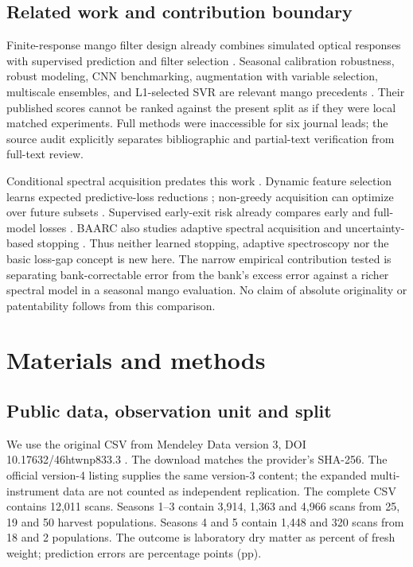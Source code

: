 \documentclass[11pt,a4paper]{article}
\begin{document}
\subsection{Related work and contribution boundary}
Finite-response mango filter design already combines simulated optical responses with supervised prediction and filter selection \citep{gutierrez2019}. Seasonal calibration robustness, robust modeling, CNN benchmarking, augmentation with variable selection, multiscale ensembles, and L1-selected SVR are relevant mango precedents \citep{anderson2020,mishra2023,walsh2024,yang2025,yang2026,ma2026}. Their published scores cannot be ranked against the present split as if they were local matched experiments. Full methods were inaccessible for six journal leads; the source audit explicitly separates bibliographic and partial-text verification from full-text review.

Conditional spectral acquisition predates this work \citep{huang2015}. Dynamic feature selection learns expected predictive-loss reductions \citep{covert2023}; non-greedy acquisition can optimize over future subsets \citep{valancius2024}. Supervised early-exit risk already compares early and full-model losses \citep{jazbec2024}. BAARC also studies adaptive spectral acquisition and uncertainty-based stopping \citep{baarc2026}. Thus neither learned stopping, adaptive spectroscopy nor the basic loss-gap concept is new here. The narrow empirical contribution tested is separating bank-correctable error from the bank's excess error against a richer spectral model in a seasonal mango evaluation. No claim of absolute originality or patentability follows from this comparison.

\section{Materials and methods}
\subsection{Public data, observation unit and split}
We use the original CSV from Mendeley Data version 3, DOI 10.17632/46htwnp833.3 \citep{andersondata2024}. The download matches the provider's SHA-256. The official version-4 listing supplies the same version-3 content; the expanded multi-instrument data are not counted as independent replication. The complete CSV contains 12,011 scans. Seasons 1--3 contain 3,914, 1,363 and 4,966 scans from 25, 19 and 50 harvest populations. Seasons 4 and 5 contain 1,448 and 320 scans from 18 and 2 populations. The outcome is laboratory dry matter as percent of fresh weight; prediction errors are percentage points (pp).
\end{document}
